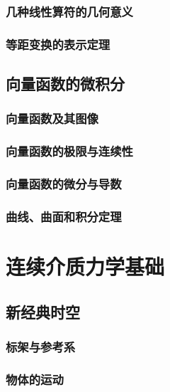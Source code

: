 \documentclass[zihao=-4,linespread=1.5,a4paper,heading=true,twoside]{ctexbook}
\theoremstyle{definition}
\theoremstyle{plain}
\begin{document}
\section{几种线性算符的几何意义}\label{sec:II.3.3}


\section{等距变换的表示定理}\label{sec:II.3.4}




\chapter{向量函数的微积分}
\section{向量函数及其图像}


\section{向量函数的极限与连续性}


\section{向量函数的微分与导数}


\section{曲线、曲面和积分定理}


\part{连续介质力学基础}
\chapter{新经典时空}
\section{标架与参考系}


\section{物体的运动}

\end{document}
